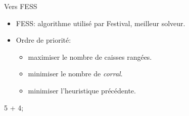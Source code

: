         \begin{frame}{Vers FESS}
            \begin{itemize}
                \item FESS: algorithme utilisé par Festival, meilleur solveur.
                \item Ordre de priorité:
                    \begin{itemize}
                        \item maximiser le nombre de caisses rangées.
                        \item minimiser le nombre de \textit{corral}.
                        \item minimiser l'heuristique précédente.
                    \end{itemize}
            \end{itemize}
        \end{frame}

        \begin{interstateframe}
            \begin{interstatenv}{15}{5 + 4};\end{interstatenv}
        \end{interstateframe}

